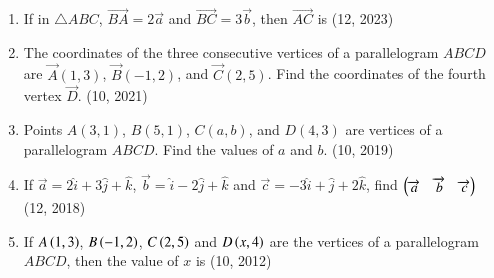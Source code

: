 \begin{enumerate}[label=\thesubsection.\arabic*, ref=\thesubsection.\theenumi]
    \item If in $\triangle ABC$, $\overrightarrow{BA} = 2\overrightarrow{a}$ and $\overrightarrow{BC} = 3\overrightarrow{b}$, then $\overrightarrow{AC}$ is
    \hfill (12, 2023)
	\item The coordinates of the three consecutive vertices of a parallelogram $ABCD$ are $\vec{A}(1, 3)$, $\vec{B}(-1, 2)$, and $\vec{C}(2, 5)$. Find the coordinates of the fourth vertex $\vec{D}$. \hfill (10, 2021)
\item Points $A(3, 1)$, $B(5, 1)$, $C(a, b)$, and $D(4, 3)$ are vertices of a parallelogram $ABCD$. Find the values of $a$ and $b$. \hfill (10, 2019)
\item If $\overrightarrow{a}=2\hat{i}+3\hat{j}+\hat{k}$, $\overrightarrow{b}=\hat{i}-2\hat{j}+\hat{k}$ and $\overrightarrow{c}=-3\hat{i}+\hat{j}+2\hat{k}$, find $\begin{pmatrix}\overrightarrow{a}&\overrightarrow{b}&\overrightarrow{c} \end{pmatrix}$
\hfill (12, 2018) 
\item If $A\left(1,3\right)$, $B\left(-1,2\right)$, $C\left(2,5\right)$ and $D\left(x,4\right)$ are the vertices of a parallelogram $ABCD$, then the value of $x$ is
\hfill (10, 2012)
	
\end{enumerate}
